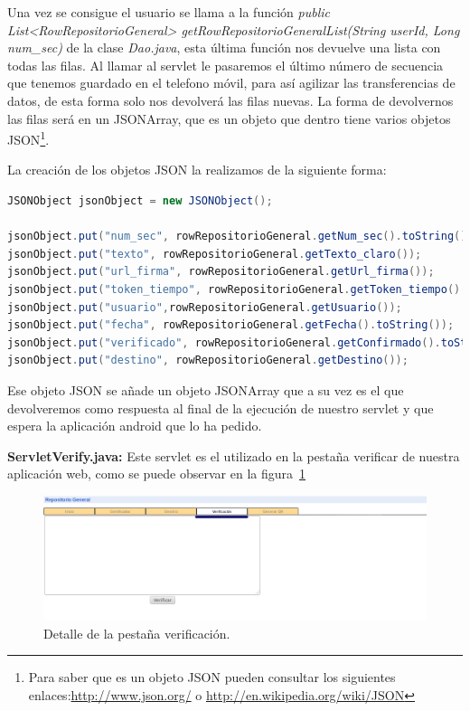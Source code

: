 \begin{description}
Una vez se consigue el usuario se llama a la función \textit{public List<RowRepositorioGeneral> getRowRepositorioGeneralList(String userId, Long num\_sec)} de la clase \textit{Dao.java}, esta última función nos devuelve una lista con todas las filas. Al llamar al servlet le pasaremos el último número de secuencia que tenemos guardado en el telefono móvil, para así agilizar las transferencias de datos, de esta forma solo nos devolverá las filas nuevas. La forma de devolvernos las filas será en un JSONArray, que es un objeto que dentro tiene varios objetos JSON\footnote{Para saber que es un objeto JSON pueden consultar los siguientes enlaces:\url{http://www.json.org/} o \url{http://en.wikipedia.org/wiki/JSON}}.

La creación de los objetos JSON la realizamos de la siguiente forma:
\begin{lstlisting}[language=Java]
JSONObject jsonObject = new JSONObject();

jsonObject.put("num_sec", rowRepositorioGeneral.getNum_sec().toString());
jsonObject.put("texto", rowRepositorioGeneral.getTexto_claro());
jsonObject.put("url_firma", rowRepositorioGeneral.getUrl_firma());
jsonObject.put("token_tiempo", rowRepositorioGeneral.getToken_tiempo().toString());
jsonObject.put("usuario",rowRepositorioGeneral.getUsuario());
jsonObject.put("fecha", rowRepositorioGeneral.getFecha().toString());
jsonObject.put("verificado", rowRepositorioGeneral.getConfirmado().toString());
jsonObject.put("destino", rowRepositorioGeneral.getDestino());
\end{lstlisting}

Ese objeto JSON se añade un objeto JSONArray que a su vez es el que devolveremos como respuesta al final de la ejecución de nuestro servlet y que espera la aplicación android que lo ha pedido.

\item \textbf{ServletVerify.java:} Este servlet es el utilizado en la pestaña verificar de nuestra aplicación web, como se puede observar en la figura~\ref{fig:pestañaVerificar}

\begin{figure}

    \includegraphics[scale=0.5]{./GoogleAppEngine/imagenes/pestanhaVerificar.png}
  \caption{Detalle de la pestaña verificación.}
  \label{fig:pestañaVerificar}
\end{figure}


\end{description}
